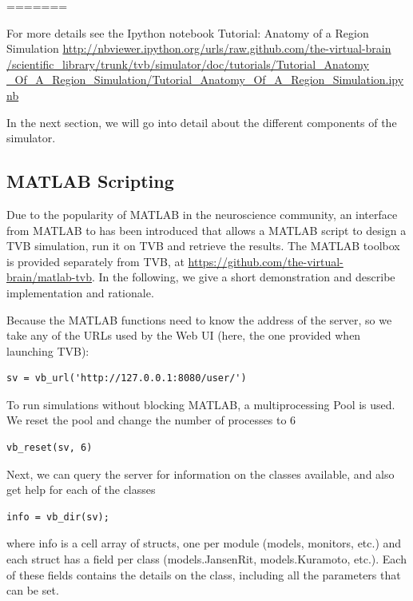 
=======

For more details see the Ipython notebook Tutorial: Anatomy of a Region Simulation 
\url{http://nbviewer.ipython.org/urls/raw.github.com/the-virtual-brain
/scientific_library/trunk/tvb/simulator/doc/tutorials/Tutorial_Anatomy
_Of_A_Region_Simulation/Tutorial_Anatomy_Of_A_Region_Simulation.ipynb}

In the next section, we will go into detail about the different
components of the simulator.

\subsection{MATLAB Scripting}

Due to the popularity of MATLAB in the neuroscience community, an
interface from MATLAB to \TVB has been introduced that allows a MATLAB
script to design a TVB simulation, run it on TVB and retrieve the 
results. The MATLAB toolbox is provided separately from TVB, at
\url{https://github.com/the-virtual-brain/matlab-tvb}.
In the following, we give a short demonstration and 
describe implementation and rationale.

Because the MATLAB functions need to know the address of the server,
so we take any of the URLs used by the Web UI (here, the one provided
when launching TVB):

\begin{lstlisting}
sv = vb_url('http://127.0.0.1:8080/user/')
\end{lstlisting}

To run simulations without blocking MATLAB, a multiprocessing Pool
is used. We reset the pool and change the number of processes to 6

\begin{lstlisting}
vb_reset(sv, 6)
\end{lstlisting}

Next, we can query the server for information on the classes available,
and also get help for each of the classes

\begin{lstlisting}
info = vb_dir(sv);
\end{lstlisting}

\noindent where info is a cell array of structs, one per module (models,
monitors, etc.) and each struct has a field per class (models.JansenRit, 
models.Kuramoto, etc.). Each of these fields contains the details on 
the class, including all the parameters that can be set. 

